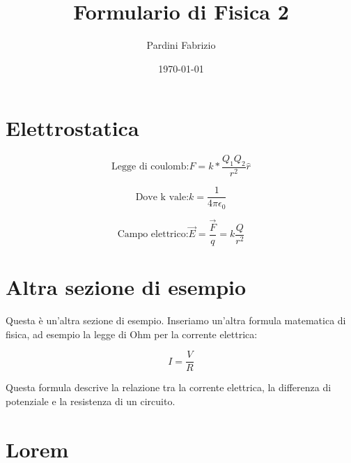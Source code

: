 \documentclass[a4paper,12pt]{article}
\begin{document}
	
	\title{\Large\bfseries Formulario di Fisica 2\vspace{-1em}}
	\author{Pardini Fabrizio\vspace{-1cm}}
	\date{\today\vspace{-1em}}
	\maketitle
	
	\begin{multicols}{3}
		\setlength{\columnseprule}{0.03pt}
		\def\columnseprulecolor{\color{black}}
		
		\section{Elettrostatica}
		
		
		\begin{equation}
			\text{Legge di coulomb:}F=k*\frac{Q_{1}Q_{2}}{r^{2}}\hat{r}
		\end{equation}
	
		\begin{equation}
			\text{Dove k vale:}k=\frac{1}{4\pi\epsilon_{0}}
		\end{equation}
	
		
		\begin{equation}
			\text{Campo elettrico:}\vec{E}=\frac{\vec{F}}{q}=k\frac{Q}{r^{2}}
		\end{equation}
		
		
		\section{Altra sezione di esempio}
		
		Questa è un'altra sezione di esempio. Inseriamo un'altra formula matematica di fisica, ad esempio la legge di Ohm per la corrente elettrica:
		
		\begin{equation}
			I=\frac{V}{R}
		\end{equation}
		
		Questa formula descrive la relazione tra la corrente elettrica, la differenza di potenziale e la resistenza di un circuito.
		
		
		\section{Lorem}
		\lipsum[1-20]
	\end{multicols}
	
\end{document}
